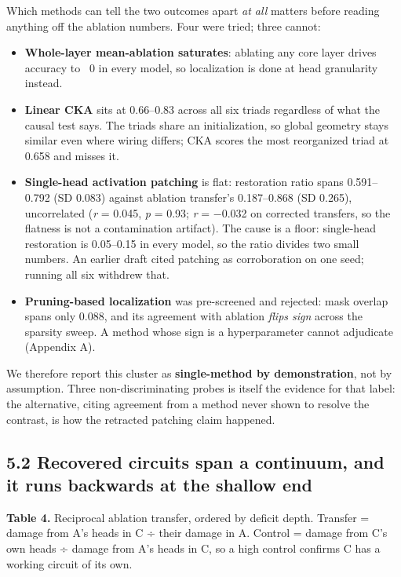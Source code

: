 \documentclass[11pt]{article}
\providecommand{\tightlist}{\setlength{\itemsep}{0pt}\setlength{\parskip}{0pt}}
\begin{document}
Which methods can tell the two outcomes apart \emph{at all} matters before reading anything off
the ablation numbers. Four were tried; three cannot:

\begin{itemize}
\tightlist
\item
  \textbf{Whole-layer mean-ablation saturates}: ablating any core layer drives accuracy to ~0 in
  every model, so localization is done at head granularity instead.
\item
  \textbf{Linear CKA} sits at 0.66--0.83 across all six triads regardless of what the causal test
  says. The triads share an initialization, so global geometry stays similar even where
  wiring differs; CKA scores the most reorganized triad at 0.658 and misses it.
\item
  \textbf{Single-head activation patching} is flat: restoration ratio spans 0.591--0.792 (SD 0.083)
  against ablation transfer's 0.187--0.868 (SD 0.265), uncorrelated (\emph{r} = 0.045, \emph{p} = 0.93;
  \emph{r} = −0.032 on corrected transfers, so the flatness is not a contamination artifact). The
  cause is a floor: single-head restoration is 0.05--0.15 in every model, so the ratio
  divides two small numbers. An earlier draft cited patching as corroboration on one seed;
  running all six withdrew that.
\item
  \textbf{Pruning-based localization} was pre-screened and rejected: mask overlap spans only 0.088,
  and its agreement with ablation \emph{flips sign} across the sparsity sweep. A method whose sign
  is a hyperparameter cannot adjudicate (Appendix A).
\end{itemize}

We therefore report this cluster as \textbf{single-method by demonstration}, not by assumption.
Three non-discriminating probes is itself the evidence for that label: the alternative,
citing agreement from a method never shown to resolve the contrast, is how the retracted
patching claim happened.

\subsection{5.2 Recovered circuits span a continuum, and it runs backwards at the shallow end}\label{recovered-circuits-span-a-continuum-and-it-runs-backwards-at-the-shallow-end}

\textbf{Table 4.} Reciprocal ablation transfer, ordered by deficit depth. Transfer = damage from
A's heads in C ÷ their damage in A. Control = damage from C's own heads ÷ damage from A's
heads in C, so a high control confirms C has a working circuit of its own.
\end{document}
